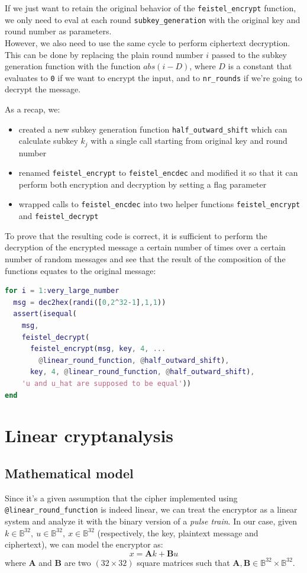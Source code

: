 \documentclass[a4paper,12pt,titlepage]{article}
\begin{document}
If we just want to retain the original behavior of the \texttt{feistel\_encrypt} 
function, we only need to eval at each round \texttt{subkey\_generation} with the
original key and round number as parameters. \\
However, we also need to use the same cycle to perform ciphertext decryption. \\
This can be done by replacing the plain round number $i$ passed to the subkey
generation function with the function $abs(i - D)$, where
$D$ is a constant that
evaluates to \texttt{0} if we want to encrypt the input, and to \texttt{nr\_rounds} if we're
going to decrypt the message.

As a recap, we:

\begin{itemize}
	\item created a new subkey generation function \texttt{half\_outward\_shift} which can
        calculate subkey $k_j$ with a single call starting from original key and round
        number
	\item renamed \texttt{feistel\_encrypt} to \texttt{feistel\_encdec} and modified it so that it can
        perform both encryption and decryption by setting a flag parameter
	\item wrapped calls to \texttt{feistel\_encdec} into two helper functions \texttt{feistel\_encrypt}
	      and \texttt{feistel\_decrypt}
\end{itemize}

To prove that the resulting code is correct, it is sufficient to perform the
decryption of the encrypted message a certain number of times over a certain
number of random messages and see that the result of the composition of the
functions equates to the original message:

\begin{lstlisting}[language=Matlab]
for i = 1:very_large_number
  msg = dec2hex(randi([0,2^32-1],1,1))
  assert(isequal(
    msg,
    feistel_decrypt(
      feistel_encrypt(msg, key, 4, ...
        @linear_round_function, @half_outward_shift), 
      key, 4, @linear_round_function, @half_outward_shift),
    'u and u_hat are supposed to be equal'))
end
\end{lstlisting}

\section{Linear cryptanalysis}
\subsection*{Mathematical model}
Since it's a given assumption that the cipher implemented using
\texttt{@linear\_round\_function} is indeed linear, we can treat the encryptor as a
linear system and analyze it with the binary version of a \emph{pulse train}. In our
case, given 
$k \in \mathbb{B}^{32},\: u \in \mathbb{B}^{32},\: x \in \mathbb{B}^{32}$
(respectively, the key, plaintext message and
ciphertext), we can model the encryptor as:
\[x = \mathbf{A}k + \mathbf{B}u \] 
where $\mathbf{A}$ and $\mathbf{B}$ are two $(32 \times 32)$
square matrices such that $\mathbf{A},\mathbf{B} \in \mathbb{B}^{32} \times \mathbb{B}^{32}$.
\end{document}

